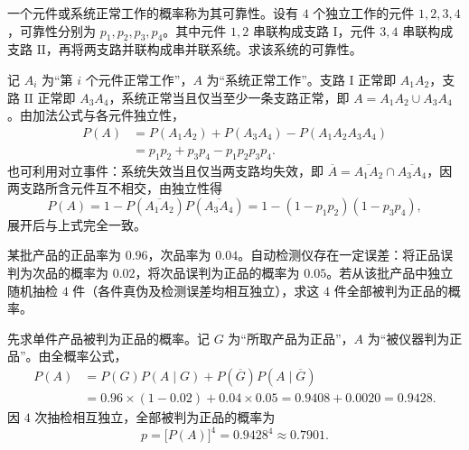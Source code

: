 \begin{example}[title={串并联系统的可靠性}]
\label{eg:series-parallel}
一个元件或系统正常工作的概率称为其可靠性。设有 $4$ 个独立工作的元件 $1,2,3,4$，可靠性分别为 $p_1,p_2,p_3,p_4$。其中元件 $1,2$ 串联构成支路 $\mathrm{I}$，元件 $3,4$ 串联构成支路 $\mathrm{II}$，再将两支路并联构成串并联系统。求该系统的可靠性。
\begin{solution}
记 $A_i$ 为“第 $i$ 个元件正常工作”，$A$ 为“系统正常工作”。支路 $\mathrm{I}$ 正常即 $A_1A_2$，支路 $\mathrm{II}$ 正常即 $A_3A_4$，系统正常当且仅当至少一条支路正常，即 $A=A_1A_2\cup A_3A_4$。由加法公式与各元件独立性，
\[
\begin{aligned}
  P(A)&=P(A_1A_2)+P(A_3A_4)-P(A_1A_2A_3A_4)\\
      &=p_1p_2+p_3p_4-p_1p_2p_3p_4.
\end{aligned}
\]
也可利用对立事件：系统失效当且仅当两支路均失效，即 $\overline{A}=\overline{A_1A_2}\cap\overline{A_3A_4}$，因两支路所含元件互不相交，由独立性得
\[
  P(A)=1-P(\overline{A_1A_2})P(\overline{A_3A_4})=1-(1-p_1p_2)(1-p_3p_4),
\]
展开后与上式完全一致。
\end{solution}
\end{example}

\begin{example}[title={抽检中的误判与独立重复检验}]
\label{eg:inspection-errors}
某批产品的正品率为 $0.96$，次品率为 $0.04$。自动检测仪存在一定误差：将正品误判为次品的概率为 $0.02$，将次品误判为正品的概率为 $0.05$。若从该批产品中独立随机抽检 $4$ 件（各件真伪及检测误差均相互独立），求这 $4$ 件全部被判为正品的概率。
\begin{solution}
先求单件产品被判为正品的概率。记 $G$ 为“所取产品为正品”，$A$ 为“被仪器判为正品”。由全概率公式，
\[
\begin{aligned}
  P(A)&=P(G)P(A\mid G)+P(\overline{G})P(A\mid\overline{G})\\
      &=0.96\times(1-0.02)+0.04\times 0.05=0.9408+0.0020=0.9428.
\end{aligned}
\]
因 $4$ 次抽检相互独立，全部被判为正品的概率为
\[
  p=\bigl[P(A)\bigr]^4=0.9428^4\approx 0.7901.
\]
\end{solution}
\end{example}

